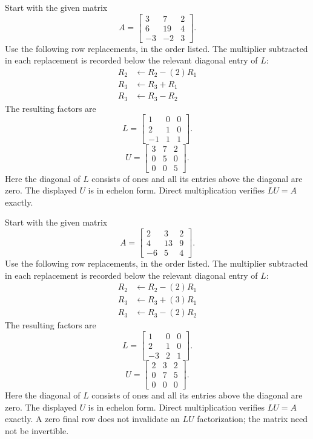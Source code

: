 Start with the given matrix
\[A=\left[\begin{matrix}3 & 7 & 2\\6 & 19 & 4\\-3 & -2 & 3\end{matrix}\right].\]
Use the following row replacements, in the order listed. The multiplier
subtracted in each replacement is recorded below the relevant diagonal
entry of $L$:
\begin{align*}R_{2}&\leftarrow R_{2}-(2)R_{1}\\
R_{3}&\leftarrow R_{3}+R_{1}\\
R_{3}&\leftarrow R_{3}-R_{2}\end{align*}The resulting factors are
\[L=\left[\begin{matrix}1 & 0 & 0\\2 & 1 & 0\\-1 & 1 & 1\end{matrix}\right].\]
\[U=\left[\begin{matrix}3 & 7 & 2\\0 & 5 & 0\\0 & 0 & 5\end{matrix}\right].\]Here the diagonal of $L$ consists of ones and all its entries above
the diagonal are zero. The displayed $U$ is in echelon form.
Direct multiplication verifies $LU=A$ exactly.

Start with the given matrix
\[A=\left[\begin{matrix}2 & 3 & 2\\4 & 13 & 9\\-6 & 5 & 4\end{matrix}\right].\]
Use the following row replacements, in the order listed. The multiplier
subtracted in each replacement is recorded below the relevant diagonal
entry of $L$:
\begin{align*}R_{2}&\leftarrow R_{2}-(2)R_{1}\\
R_{3}&\leftarrow R_{3}+(3)R_{1}\\
R_{3}&\leftarrow R_{3}-(2)R_{2}\end{align*}The resulting factors are
\[L=\left[\begin{matrix}1 & 0 & 0\\2 & 1 & 0\\-3 & 2 & 1\end{matrix}\right].\]
\[U=\left[\begin{matrix}2 & 3 & 2\\0 & 7 & 5\\0 & 0 & 0\end{matrix}\right].\]Here the diagonal of $L$ consists of ones and all its entries above
the diagonal are zero. The displayed $U$ is in echelon form.
Direct multiplication verifies $LU=A$ exactly. A zero final row does not
invalidate an $LU$ factorization; the matrix need not be invertible.

